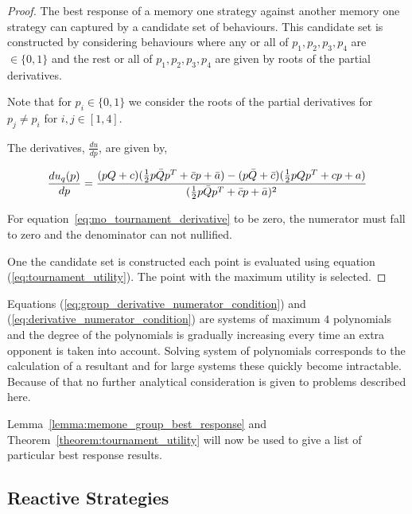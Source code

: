 \documentclass[10pt]{article}
\begin{document}
\begin{proof} The best response of a memory one strategy against another memory
    one strategy can captured by a candidate set of behaviours. This candidate
    set is constructed by considering behaviours where any or all of \(p_1, p_2, p_3, p_4\)
    are \(\in \{0, 1\}\) and the rest or all of \(p_1, p_2, p_3, p_4\) are given by
    roots of the partial derivatives.

    Note that for \(p_i \in \{0, 1\}\) we consider the roots of the partial derivatives
    for \(p_j \neq p_i\) for \(i,j \in [1, 4]\).

    The derivatives, \(\frac{du}{dp}\), are given by,

    \begin{equation}\label{eq:mo_derivative}
        \frac{du_q (p)}{dp}  = \frac{(pQ + c) ( \frac{1}{2} p  \bar{Q}  p^T + \bar{c}  p + \bar{a})
        - (p\bar{Q} + \bar{c})( \frac{1}{2} p  Q  p^T + c p + a)}
          {( \frac{1}{2} p  \bar{Q}  p^T + \bar{c}  p + \bar{a})^2} \\
    \end{equation}


    For equation~\ref{eq:mo_tournament_derivative} to be zero, the numerator must fall
    to zero and the denominator can not nullified.

    One the candidate set is constructed each point is evaluated using equation
    (\ref{eq:tournament_utility}). The point with the maximum utility is selected.
\end{proof}

Equations (\ref{eq:group_derivative_numerator_condition}) and (\ref{eq:derivative_numerator_condition})
are systems of maximum \(4\) polynomials and the degree of the polynomials is gradually increasing
every time an extra opponent is taken into account. Solving system of polynomials corresponds
to the calculation of a resultant and for large systems these quickly become intractable.
Because of that no further analytical consideration is given to problems described
here.

Lemma~\ref{lemma:memone_group_best_response} and Theorem~\ref{theorem:tournament_utility}
will now be used to give a list of particular best response results.

\subsection{Reactive Strategies}\label{section:reactive_analytical}
\end{document}
